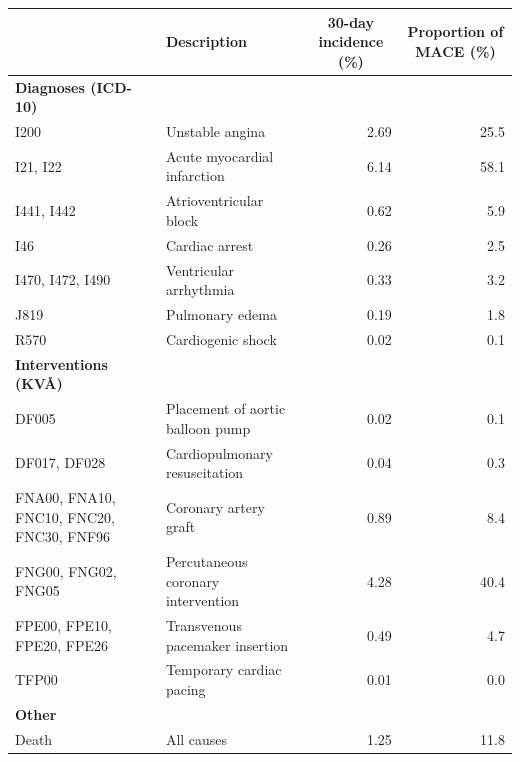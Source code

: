 \documentclass[preprint]{elsarticle}
\begin{document}
\renewcommand{\arraystretch}{1.2}
\begin{table}[H]
  \centering
  \scriptsize
\begin{adjustbox}{center}
\begin{tabular}{@{}p{3.1cm}lrr@{}}
\toprule
& \multicolumn{1}{l}{\textbf{Description}} & \multicolumn{1}{c}{\textbf{30-day incidence (\%)}} & \multicolumn{1}{c}{\textbf{Proportion of MACE (\%)}} \\
\midrule
\textbf{Diagnoses (ICD-10)} & & & \\
\midrule
I200                                          & Unstable angina                                        &  2.69       &   25.5   \\
I21, I22                                      & Acute myocardial infarction                            &  6.14       &   58.1   \\
I441, I442                                    & Atrioventricular block                                 &  0.62       &    5.9   \\
I46                                           & Cardiac arrest                                         &  0.26       &    2.5   \\
I470, I472, I490                              & Ventricular arrhythmia                                 &  0.33       &    3.2   \\
J819                                          & Pulmonary edema                                        &  0.19       &    1.8   \\
R570                                          & Cardiogenic shock                                      &  0.02       &    0.1   \\
\midrule
\textbf{Interventions (KV\AA{})} & & & \\
\midrule

DF005                                         & Placement of aortic balloon pump                       &  0.02       &    0.1   \\
DF017, DF028                                  & Cardiopulmonary resuscitation                          &  0.04       &    0.3   \\
FNA00, FNA10, FNC10, FNC20, FNC30, FNF96      & Coronary artery graft                                  &  0.89       &    8.4   \\
FNG00, FNG02, FNG05                           & Percutaneous coronary intervention                     &  4.28       &   40.4   \\
FPE00, FPE10, FPE20, FPE26                    & Transvenous pacemaker insertion                        &  0.49       &    4.7   \\
TFP00                                         & Temporary cardiac pacing                               &  0.01       &    0.0   \\
\midrule
\textbf{Other} & & & \\
\midrule
Death                                         & All causes                                             &  1.25       &   11.8   \\


\end{tabular}
\end{adjustbox}
\end{table}
\end{document}
